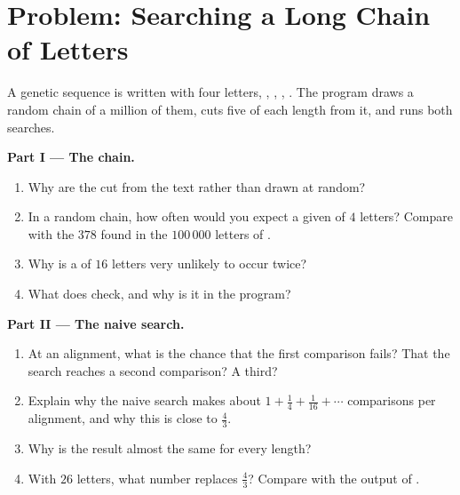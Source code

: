\section{Problem: Searching a Long Chain of Letters}\label{sec:g12:text-search:problem}

\begin{problem}\label{pb:g12:text-search:1}
A genetic sequence is written with four letters, , , , . The program draws a random
chain of a million of them, cuts five  of each length from it, and runs both searches.

\label{lst:g12:text-search:chain}

\label{out:g12:text-search:chain}

\medskip\noindent\textbf{Part I --- The chain.}
\begin{enumerate}
  \item Why are the  cut from the text rather than drawn at random?
  \item In a random chain, how often would you expect a given  of $4$ letters? Compare with the $378$ found in
    the $100\,000$ letters of .
  \item Why is a  of $16$ letters very unlikely to occur twice?
  \item What does  check, and why is it in the program?
\end{enumerate}

\medskip\noindent\textbf{Part II --- The naive search.}
\begin{enumerate}[resume]
  \item At an alignment, what is the chance that the first comparison fails? That the search reaches a second
    comparison? A third?
  \item Explain why the naive search makes about $1 + \frac14 + \frac1{16} + \dotsb$ comparisons per alignment, and
    why this is close to $\frac43$.
  \item Why is the result almost the same for every  length?
  \item With $26$ letters, what number replaces $\frac43$? Compare with the output of .
\end{enumerate}


\end{problem}
